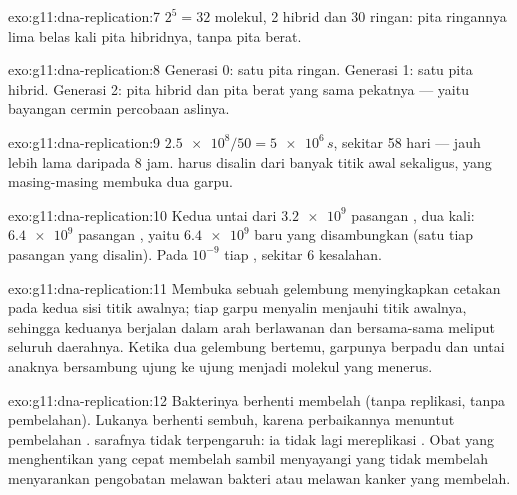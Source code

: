 \begin{solution}{exo:g11:dna-replication:7}
$2^5 = 32$ molekul, 2 hibrid dan 30 ringan: pita ringannya lima belas
kali pita hibridnya, tanpa pita berat.
\end{solution}

\begin{solution}{exo:g11:dna-replication:8}
Generasi 0: satu pita ringan. Generasi 1: satu pita hibrid. Generasi 2:
pita hibrid dan pita berat yang sama pekatnya --- yaitu bayangan cermin
percobaan aslinya.
\end{solution}

\begin{solution}{exo:g11:dna-replication:9}
$\num{2.5e8}/50 = \num{5e6}\,\unit{s}$, sekitar 58 hari --- jauh lebih
lama daripada 8 jam.  harus disalin dari banyak titik awal
sekaligus, yang masing-masing membuka dua garpu.
\end{solution}

\begin{solution}{exo:g11:dna-replication:10}
Kedua untai dari $\num{3.2e9}$ pasangan , dua kali: $\num{6.4e9}$
pasangan , yaitu $\num{6.4e9}$  baru yang disambungkan
(satu tiap pasangan  yang disalin). Pada $10^{-9}$ tiap ,
sekitar 6 kesalahan.
\end{solution}

\begin{solution}{exo:g11:dna-replication:11}
Membuka sebuah gelembung menyingkapkan cetakan pada kedua sisi titik
awalnya; tiap garpu menyalin menjauhi titik awalnya, sehingga keduanya
berjalan dalam arah berlawanan dan bersama-sama meliput seluruh
daerahnya. Ketika dua gelembung bertemu, garpunya berpadu dan untai
anaknya bersambung ujung ke ujung menjadi molekul yang menerus.
\end{solution}

\begin{solution}{exo:g11:dna-replication:12}
Bakterinya berhenti membelah (tanpa replikasi, tanpa pembelahan).
Lukanya berhenti sembuh, karena perbaikannya menuntut pembelahan .
 sarafnya tidak terpengaruh: ia tidak lagi mereplikasi . Obat
yang menghentikan  yang cepat membelah sambil menyayangi  yang
tidak membelah menyarankan pengobatan melawan bakteri atau melawan 
kanker yang membelah.
\end{solution}

